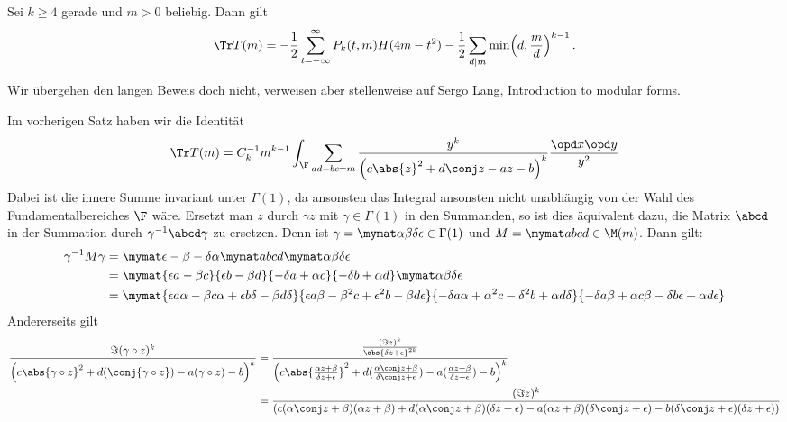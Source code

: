 \begin{theorem}
	Sei $k \geq 4$ gerade und $m > 0$ beliebig. Dann gilt
	\[
		\Tr T(m) = -\frac{1}{2} \sum_{t=-\infty}^\infty P_k(t,m) H(4m-t^2) - \frac{1}{2} \sum_{d|m} \min\Bigl(d, \frac{m}{d}\Bigr)^{k-1}\,.
	\]
\end{theorem}

\begin{bewe}
	Wir übergehen den langen Beweis doch nicht, verweisen aber stellenweise auf Sergo Lang, Introduction to modular forms.
	
Im vorherigen Satz haben wir die Identität
\[
	\Tr T(m) = C_k^{-1} m^{k-1} \int_{\F} \sum_{ad-bc = m} \frac{y^k}{\left(c \abs{z}^2 + d \conj z - az - b\right)^k} \frac{\opd x \opd y}{y^2}
\]
Dabei ist die innere Summe invariant unter $\Gamma(1)$, da ansonsten das Integral ansonsten nicht unabhängig von der Wahl des Fundamentalbereiches $\F$ wäre. Ersetzt man $z$ durch $\gamma z$ mit $\gamma \in \Gamma(1)$ in den Summanden, so ist dies äquivalent dazu, die Matrix $\abcd$ in der Summation durch $\gamma^{-1} \abcd \gamma$ zu ersetzen. Denn ist $\gamma = \mymat \alpha \beta \delta \epsilon \in \Gamma(1)$ und $M = \mymat abcd \in \M(m)$. Dann gilt:
\begin{align*}
	\gamma^{-1} M \gamma &= \mymat \epsilon -\beta -\delta \alpha \mymat abcd \mymat \alpha \beta \delta \epsilon \\
	&= \mymat {\epsilon a - \beta c} {\epsilon b - \beta d} {-\delta a + \alpha c} {- \delta b + \alpha d} \mymat \alpha \beta \delta \epsilon \\
	&= \mymat {\epsilon a \alpha - \beta c \alpha + \epsilon b \delta - \beta d \delta} {\epsilon a \beta - \beta^2 c + \epsilon^2 b - \beta d \epsilon} {-\delta a \alpha + \alpha^2 c - \delta^2 b + \alpha d \delta} {-\delta a \beta + \alpha c \beta - \delta b \epsilon + \alpha d \epsilon}
\end{align*}
Andererseits gilt 
\begin{align*}
	\frac {\Im(\gamma \circ z)^k} {\left( c \abs {\gamma \circ z}^2 + d (\conj{\gamma \circ z}) - a (\gamma \circ z) - b \right)^k} &= \frac {\frac {(\Im z)^k} {\abs{\delta z + \epsilon}^{2k}}} {\left( c \abs {\frac{\alpha z + \beta}{\delta z + \epsilon}}^2 + d (\frac{\alpha \conj z + \beta}{\delta \conj z + \epsilon}) - a (\frac{\alpha z + \beta}{\delta z + \epsilon}) - b \right)^k} \\
	&= \frac {(\Im z)^k} {\left( c(\alpha \conj z + \beta) (\alpha z + \beta) + d(\alpha \conj z + \beta)(\delta z + \epsilon) - a (\alpha z + \beta)(\delta \conj z + \epsilon) -b (\delta \conj z + \epsilon)(\delta z + \epsilon) \right)} \\

\end{align*}
\end{bewe}
